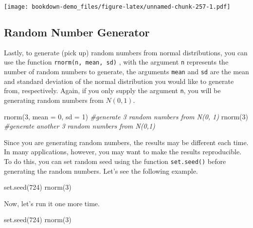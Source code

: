 \documentclass[
]{book}
\newenvironment{Shaded}{\begin{snugshade}}{\end{snugshade}}
\newcommand{\AttributeTok}[1]{\textcolor[rgb]{0.77,0.63,0.00}{#1}}
\newcommand{\CommentTok}[1]{\textcolor[rgb]{0.56,0.35,0.01}{\textit{#1}}}
\newcommand{\DecValTok}[1]{\textcolor[rgb]{0.00,0.00,0.81}{#1}}
\newcommand{\FunctionTok}[1]{\textcolor[rgb]{0.00,0.00,0.00}{#1}}
\newcommand{\NormalTok}[1]{#1}
\begin{document}
\texttt{[image: bookdown-demo\_files/figure-latex/unnamed-chunk-257-1.pdf]}

\hypertarget{rng}{%
\subsection{Random Number Generator}\label{rng}}

Lastly, to generate (pick up) random numbers from normal distributions, you can use the function \texttt{rnorm(n,\ mean,\ sd)} , with the argument \texttt{n} represents the number of random numbers to generate, the arguments \texttt{mean} and \texttt{sd} are the mean and standard deviation of the normal distribution you would like to generate from, respectively. Again, if you only supply the argument \texttt{n}, you will be generating random numbers from \(N(0,1)\).

\begin{Shaded}
\begin{Highlighting}[]
\FunctionTok{rnorm}\NormalTok{(}\DecValTok{3}\NormalTok{, }\AttributeTok{mean =} \DecValTok{0}\NormalTok{, }\AttributeTok{sd =} \DecValTok{1}\NormalTok{) }\CommentTok{\#generate 3 random numbers from N(0, 1)}
\FunctionTok{rnorm}\NormalTok{(}\DecValTok{3}\NormalTok{) }\CommentTok{\#generate another 3 random numbers from N(0,1)}
\end{Highlighting}
\end{Shaded}

Since you are generating random numbers, the results may be different each time. In many applications, however, you may want to make the results reproducible. To do this, you can set random seed using the function \texttt{set.seed()} before generating the random numbers. Let's see the following example.

\begin{Shaded}
\begin{Highlighting}[]
\FunctionTok{set.seed}\NormalTok{(}\DecValTok{724}\NormalTok{)}
\FunctionTok{rnorm}\NormalTok{(}\DecValTok{3}\NormalTok{) }
\end{Highlighting}
\end{Shaded}

Now, let's run it one more time.

\begin{Shaded}
\begin{Highlighting}[]
\FunctionTok{set.seed}\NormalTok{(}\DecValTok{724}\NormalTok{)}
\FunctionTok{rnorm}\NormalTok{(}\DecValTok{3}\NormalTok{) }
\end{Highlighting}
\end{Shaded}
\end{document}
